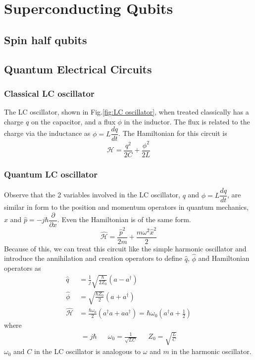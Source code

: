 \section{Superconducting Qubits}

\subsection{Spin half qubits}

\subsection{Quantum Electrical Circuits}

\subsubsection{Classical LC oscillator}


The LC oscillator, shown in Fig.\ref{fig:LC oscillator}, when treated classically has a charge $q$ on the capacitor, and a flux $\phi$ in the inductor. The flux is related to the charge via the inductance as $\phi=L\dfrac{dq}{dt}$. The Hamiltonian for this circuit is
\begin{equation}
\mathcal{H}=\frac{q^2}{2C}+\frac{\phi^2}{2L}
\end{equation}

\subsubsection{Quantum LC oscillator}

Observe that the 2 variables involved in the LC oscillator, $q$ and $\phi=L\dfrac{dq}{dt}$, are similar in form to the position and momentum operators in quantum mechanics, $\hat{x}$ and $\hat{p}=-j\hbar\dfrac{\partial}{\partial x}$. Even the Hamiltonian is of the same form.\parencite{Devoret1995}
\begin{equation}
\hat{\mathcal{H}}=\frac{\hat{p}^2}{2m}+\frac{m\omega^2\hat{x}^2}{2}
\end{equation}
Because of this, we can treat this circuit like the simple harmonic oscillator and introduce the annihilation and creation operators to define $\hat{q}$, $\hat{\phi}$ and Hamiltonian operators as
\begin{subequations}
\begin{align}
\hat{q}&=\frac{1}{j}\sqrt{\frac{\hbar}{2Z_0}}(a-a^\dag)\\
\hat{\phi}&=\sqrt{\frac{\hbar Z_0}{2}}(a+a^\dag)\\
\hat{\mathcal{H}}&=\frac{\hbar\omega_0}{2}(a^\dag a+aa^\dag)=\hbar\omega_0\left(a^\dag a + \frac{1}{2}\right)
\end{align}
\end{subequations}
where
\begin{align*}
[\hat{\phi},\hat{q}]=j\hbar&&
\omega_0=\frac{1}{\sqrt{LC}}&&
Z_0=\sqrt{\frac{L}{C}}
\end{align*}
$\omega_0$ and $C$ in the LC oscillator is analogous to $\omega$ and $m$ in the harmonic oscillator.

